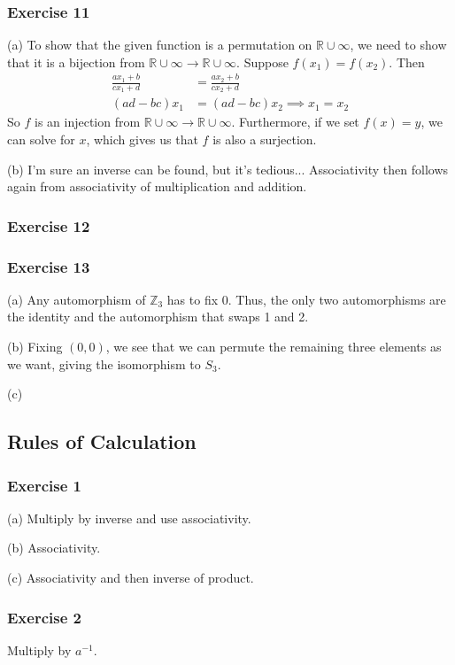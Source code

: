 \subsubsection{Exercise 11}
(a) To show that the given function is a permutation on $\mathbb{R}\cup{\infty}$, we need to show that it is a
bijection from $\mathbb{R}\cup{\infty} \to \mathbb{R}\cup{\infty}$.
Suppose $f(x_1) = f(x_2)$. Then
\begin{align*}
        \frac{ax_1 + b}{cx_1 + d} &= \frac{ax_2 + b}{cx_2 + d} \\
        (ad - bc)x_1 &= (ad - bc)x_2 \implies x_1 = x_2
\end{align*}
So $f$ is an injection from $\mathbb{R}\cup{\infty} \to \mathbb{R}\cup{\infty}$. Furthermore, if
we set $f(x) = y$, we can solve for $x$, which gives us that $f$ is also a surjection.

(b) I'm sure an inverse can be found, but it's tedious... Associativity then follows again from associativity
of multiplication and addition.

\subsubsection{Exercise 12}

\subsubsection{Exercise 13}
(a) Any automorphism of $\mathbb{Z}_3$ has to fix 0. Thus, the only two automorphisms are the identity
and the automorphism that swaps 1 and 2.

(b) Fixing $(0, 0)$, we see that we can permute the remaining three elements as we want, giving
the isomorphism to $S_3$.

(c) 

\subsection{Rules of Calculation}

\subsubsection{Exercise 1}
(a) Multiply by inverse and use associativity.

(b) Associativity.

(c) Associativity and then inverse of product.

\subsubsection{Exercise 2}
Multiply by $a^{-1}$.

